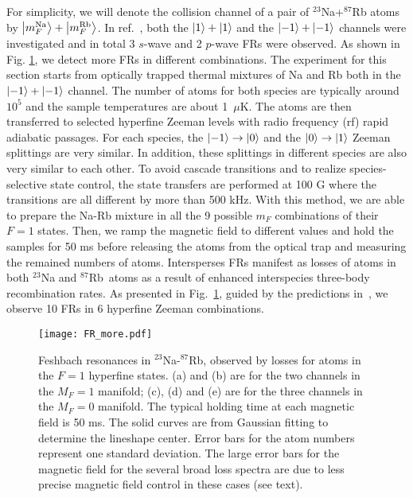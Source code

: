 For simplicity, we will denote the collision channel of a pair of $^{23}$Na+$^{87}$Rb atoms by $\ket{m_F^{\rm Na}}+\ket{m_F^{\rm Rb}}$. In ref.~\cite{wang2013observation}, both the $\ket{1}+\ket{1}$ and the $\ket{-1}+\ket{-1}$ channels were investigated and in total 3 $s$-wave and 2 $p$-wave FRs were observed. As shown in Fig. \ref{FR_more}, we detect more FRs in different combinations. The experiment for this section starts from optically trapped thermal mixtures of Na and Rb both in the $\ket{-1}+\ket{-1}$ channel. The number of atoms for both species are typically around $10^5$ and the sample temperatures are about 1~$\mu$K. The atoms are then transferred to selected hyperfine Zeeman levels with radio frequency (rf) rapid adiabatic passages. For each species, the $\ket{-1}\rightarrow \ket{0}$ and the $\ket{0}\rightarrow \ket{1}$ Zeeman splittings are very similar. In addition, these splittings in different species are also very similar to each other. To avoid cascade transitions and to realize species-selective state control, the state transfers are performed at 100 G where the transitions are all different by more than 500 kHz. With this method, we are able to prepare the Na-Rb mixture in all the 9 possible $m_F$ combinations of their $F = 1$ states. Then, we ramp the magnetic field to different values and hold the samples for 50 ms before releasing the atoms from the optical trap and measuring the remained numbers of atoms. Intersperses FRs manifest as losses of atoms in both $^{23}$Na and $^{87}$Rb~atoms as a result of enhanced interspecies three-body recombination rates. As presented in Fig.~\ref{FR_more}, guided by the predictions in~\cite{wang2013observation}, we observe 10 FRs in 6 hyperfine Zeeman combinations. 

\begin{figure}[htb]
\begin{center}
\texttt{[image: FR\_more.pdf]}
\end{center}
\caption[Loss spectroscopy of Feshbach resonance with different spin combinations]{Feshbach resonances in $^{23}$Na-$^{87}$Rb, observed by losses for atoms in the $F = 1$ hyperfine states. (a) and (b) are for the two channels in the $M_F = 1$ manifold; (c), (d) and (e) are for the three channels in the $M_F = 0$ manifold. The typical holding time at each magnetic field is 50 ms. The solid curves are from Gaussian fitting to determine the lineshape center. Error bars for the atom numbers represent one standard deviation. The large error bars for the magnetic field for the several broad loss spectra are due to less precise magnetic field control in these cases (see text).}
\label{FR_more}
\end{figure}

